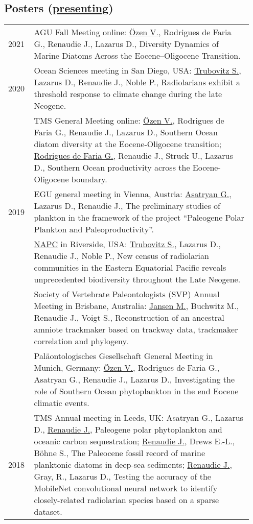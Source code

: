 \documentclass[11pt, a4paper]{article}
\begin{document}
\subsection[Posters]{Posters \textnormal{\footnotesize{(\underline{presenting})}}}
\begin{longtable}{@{}p{0.1\linewidth} P{0.85\linewidth}@{}}
2021 & AGU Fall Meeting online: \underline{Özen V.}, Rodrigues de Faria G., Renaudie J., Lazarus D., Diversity Dynamics of Marine Diatoms Across the Eocene--Oligocene Transition.\\
2020 & Ocean Sciences meeting in San Diego, USA: \underline{Trubovitz S.}, Lazarus D., Renaudie J., Noble P., Radiolarians exhibit a threshold response to climate change during the late Neogene.\\
 & TMS General Meeting online: \underline{\"{O}zen V.}, Rodrigues de Faria G., Renaudie J., Lazarus D., Southern Ocean diatom diversity at the Eocene-Oligocene transition; \underline{Rodrigues de Faria G.}, Renaudie J., Struck U., Lazarus D., Southern Ocean productivity across the Eocene-Oligocene boundary.\\
2019 & EGU general meeting in Vienna, Austria: \underline{Asatryan G.}, Lazarus D., Renaudie J., The preliminary studies of plankton in the framework of the project ``Paleogene Polar Plankton and Paleoproductivity''.\\
& \href{https://escholarship.org/uc/item/6r18f8wn}{NAPC} in Riverside, USA: \underline{Trubovitz S.}, Lazarus D., Renaudie J., Noble P., New census of radiolarian communities in the Eastern Equatorial Pacific reveals unprecedented biodiversity throughout the Late Neogene.\\
& Society of Vertebrate Paleontologists (SVP) Annual Meeting in Brisbane, Australia: \underline{Jansen M.}, Buchwitz M., Renaudie J., Voigt S., Reconstruction of an ancestral amniote trackmaker based on trackway data, trackmaker correlation and phylogeny.\\
& Paläontologisches Gesellschaft General Meeting in Munich, Germany: \underline{\"{O}zen V.}, Rodrigues de Faria G., Asatryan G., Renaudie J., Lazarus D., Investigating the role of Southern Ocean phytoplankton in the end Eocene climatic events.\\
2018 & TMS Annual meeting in Leeds, UK: Asatryan G., Lazarus D., \underline{Renaudie J.}, Paleogene polar phytoplankton and oceanic carbon sequestration; \underline{Renaudie J.}, Drews E.-L., Böhne S., The Paleocene fossil record of marine planktonic diatoms in deep-sea sediments; \underline{Renaudie J.}, Gray, R., Lazarus D., Testing the accuracy of the MobileNet convolutional neural network to identify closely-related radiolarian species based on a sparse dataset.\\

\end{longtable}
\end{document}
